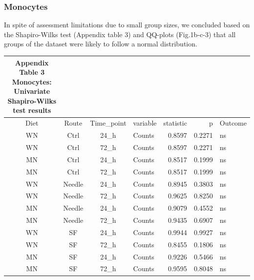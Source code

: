 \documentclass[
  12pt,
  letterpaper,
]{article}
\begin{document}
\subsubsection{Monocytes}\label{monocytes}

In spite of assessment limitations due to small group sizes, we concluded based on the Shapiro-Wilks test (Appendix table 3) and QQ-plots (Fig.1b-c-3) that all groups of the dataset were likely to follow a normal distribution.

\begingroup
\fontsize{12.0pt}{14.4pt}\selectfont
\begin{longtable}{ccclrrl}
\caption*{
{\large \textbf{Appendix Table 3}} \\ 
{\small \textbf{Monocytes: Univariate Shapiro-Wilks test results}}
} \\ 
\toprule
{Diet} & {Route} & Time\_point & {variable} & {statistic} & {p} & {Outcome} \\ 
\midrule\addlinespace[2.5pt]
WN & Ctrl & 24\_h & Counts & 0.8597 & 0.2271 & ns \\ 
WN & Ctrl & 72\_h & Counts & 0.8597 & 0.2271 & ns \\ 
MN & Ctrl & 24\_h & Counts & 0.8517 & 0.1999 & ns \\ 
MN & Ctrl & 72\_h & Counts & 0.8517 & 0.1999 & ns \\ 
WN & Needle & 24\_h & Counts & 0.8945 & 0.3803 & ns \\ 
WN & Needle & 72\_h & Counts & 0.9625 & 0.8250 & ns \\ 
MN & Needle & 24\_h & Counts & 0.9079 & 0.4552 & ns \\ 
MN & Needle & 72\_h & Counts & 0.9435 & 0.6907 & ns \\ 
WN & SF & 24\_h & Counts & 0.9944 & 0.9927 & ns \\ 
WN & SF & 72\_h & Counts & 0.8455 & 0.1806 & ns \\ 
MN & SF & 24\_h & Counts & 0.9226 & 0.5466 & ns \\ 
MN & SF & 72\_h & Counts & 0.9595 & 0.8048 & ns \\ 
\bottomrule
\end{longtable}
\endgroup
\end{document}
